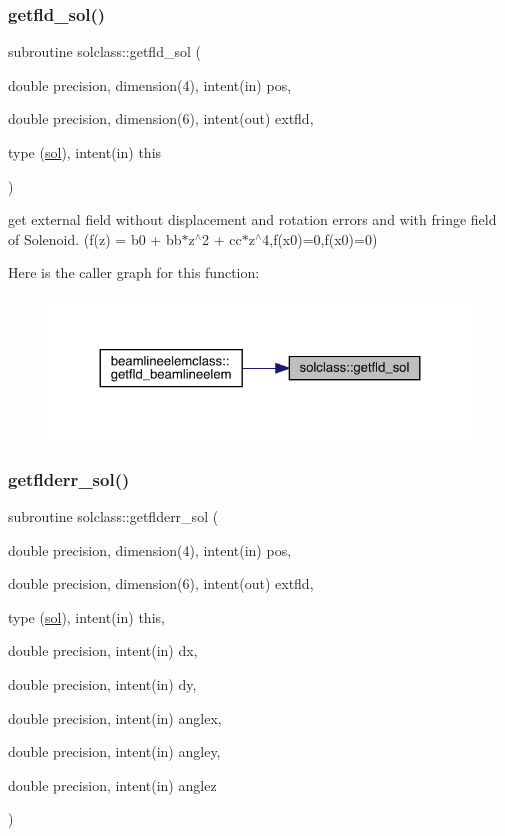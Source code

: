 \subsubsection{\texorpdfstring{getfld\_sol()}{getfld\_sol()}}
{\footnotesize\ttfamily subroutine solclass\+::getfld\+\_\+sol (\begin{DoxyParamCaption}\item[{double precision, dimension(4), intent(in)}]{pos,  }\item[{double precision, dimension(6), intent(out)}]{extfld,  }\item[{type (\mbox{\hyperlink{namespacesolclass_structsolclass_1_1sol}{sol}}), intent(in)}]{this }\end{DoxyParamCaption})}



get external field without displacement and rotation errors and with fringe field of Solenoid. (f(z) = b0 + bb$\ast$z$^\wedge$2 + cc$\ast$z$^\wedge$4,f(x0)=0,f\textquotesingle{}(x0)=0) 

Here is the caller graph for this function\+:\nopagebreak
\begin{figure}[H]
\begin{center}
\leavevmode
\includegraphics[width=324pt]{namespacesolclass_a7a865f7ab4470f9bff328ed98aacd7c8_icgraph}
\end{center}
\end{figure}
\mbox{\label{namespacesolclass_a571ab7b6c8ce4dd9e7eaa2489b874682}} 
\subsubsection{\texorpdfstring{getflderr\_sol()}{getflderr\_sol()}}
{\footnotesize\ttfamily subroutine solclass\+::getflderr\+\_\+sol (\begin{DoxyParamCaption}\item[{double precision, dimension(4), intent(in)}]{pos,  }\item[{double precision, dimension(6), intent(out)}]{extfld,  }\item[{type (\mbox{\hyperlink{namespacesolclass_structsolclass_1_1sol}{sol}}), intent(in)}]{this,  }\item[{double precision, intent(in)}]{dx,  }\item[{double precision, intent(in)}]{dy,  }\item[{double precision, intent(in)}]{anglex,  }\item[{double precision, intent(in)}]{angley,  }\item[{double precision, intent(in)}]{anglez }\end{DoxyParamCaption})}



